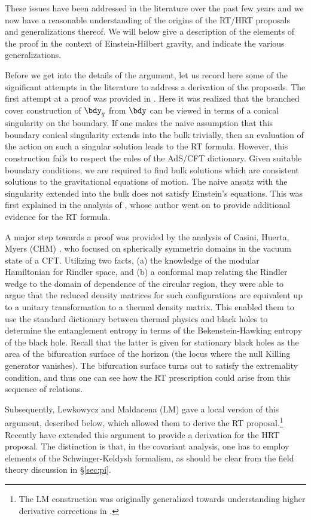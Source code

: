 \documentclass[12pt,openany]{book}
\begin{document}
These issues have been addressed in the literature over the past few years and we now have a reasonable understanding of the origins of the RT/HRT proposals and generalizations thereof. We will below give a  description of the elements of the proof in the context of Einstein-Hilbert gravity, and indicate the various generalizations.

Before we get into the details of the argument, let us record here some of the significant attempts in the literature to address a derivation of the proposals. The first attempt at a proof was provided in \cite{Fursaev:2006ih}. Here it was realized that the branched cover construction of $\bdy_q$ from $\bdy$ can be viewed in terms of a conical singularity on the boundary. If one makes the naive assumption that this boundary conical singularity extends into the bulk trivially, then an evaluation of the action on such a singular solution leads to the RT formula. However, this construction fails to respect the rules of the AdS/CFT dictionary. Given suitable boundary conditions, we are required to find bulk solutions which are consistent solutions to the gravitational equations of motion. The naive ansatz with the singularity extended into the bulk  does not satisfy Einstein's equations. This  was first explained in the analysis of \cite{Headrick:2010zt}, whose author went on to provide additional evidence for the RT formula.

A major step towards a proof was provided by the analysis of Casini, Huerta, Myers (CHM) \cite{Casini:2011kv}, who focused on spherically symmetric domains in the vacuum state of a CFT. Utilizing two facts, (a) the knowledge of the modular Hamiltonian for Rindler space, and (b) a conformal map relating the Rindler wedge to the domain of dependence of the circular region, they were able to argue that the reduced density matrices for such configurations are equivalent up to  a unitary transformation to a thermal density matrix. This enabled them to use the standard dictionary between thermal physics and black holes to determine the entanglement entropy in terms of the Bekenstein-Hawking entropy of the black hole. Recall that the latter is given for stationary black holes as the area of the  bifurcation surface of the horizon (the locus where the null Killing generator vanishes). The bifurcation surface turns out to satisfy the extremality condition, and thus one can see how the RT prescription could arise from this sequence of relations.


Subsequently, Lewkowycz and Maldacena (LM) \cite{Lewkowycz:2013nqa} gave a local version of this argument, described below, which allowed them to derive the RT proposal.\footnote{ The LM construction was originally generalized towards understanding higher derivative corrections in \cite{Dong:2013qoa,Camps:2013zua}.}  Recently \cite{Dong:2016hjy} have extended this argument to provide a derivation for the  HRT proposal. The distinction is that, in the covariant analysis, one has to employ  elements of the Schwinger-Keldysh formalism, as should be clear from the field theory discussion in \S\ref{sec:pi}.
\end{document}
